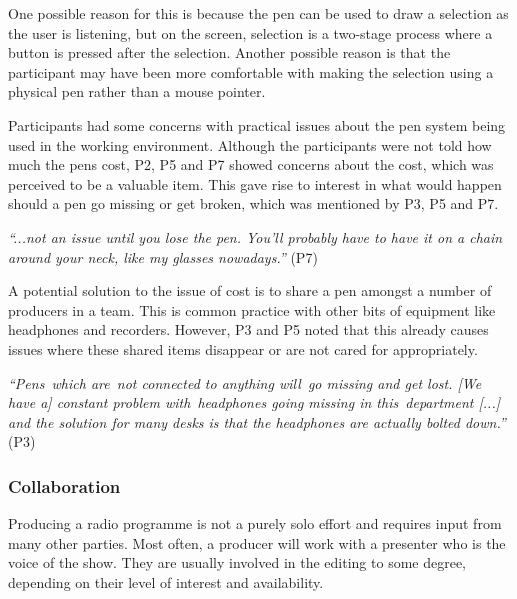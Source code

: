 One possible reason for this is because the pen can be used to draw a selection as the user is listening, but on the
screen, selection is a two-stage process where a button is pressed after the selection. Another possible reason is that
the participant may have been more comfortable with making the selection using a physical pen rather than a mouse
pointer.



Participants had some concerns with practical issues about the pen system being used in the working environment.
Although the participants were not told how much the pens cost, P2, P5 and P7 showed concerns about the cost, which was
perceived to be a valuable item.  This gave rise to interest in what would happen should a pen go missing or get
broken, which was mentioned by P3, P5 and P7. 

\textit{``...not an issue until you lose the pen. You'll probably have to have it on a chain around your neck, like my
glasses nowadays.''} (P7)

A potential solution to the issue of cost is to share a pen amongst a number of producers in a team. This is
common practice with other bits of equipment like headphones and recorders. However, P3 and P5 noted that this already
causes issues where these shared items disappear or are not cared for appropriately.

\textit{``Pens which are not connected to anything will go missing and get lost.
  [We have a] constant problem with headphones going missing in this department [...]
  and the solution for many desks is that the headphones are actually bolted down.''} (P3)

\subsubsection{Collaboration}


Producing a radio programme is not a purely solo effort and requires input from many other parties. Most
often, a producer will work with a presenter who is the voice of the show. They are usually involved in the
editing to some degree, depending on their level of interest and availability.

